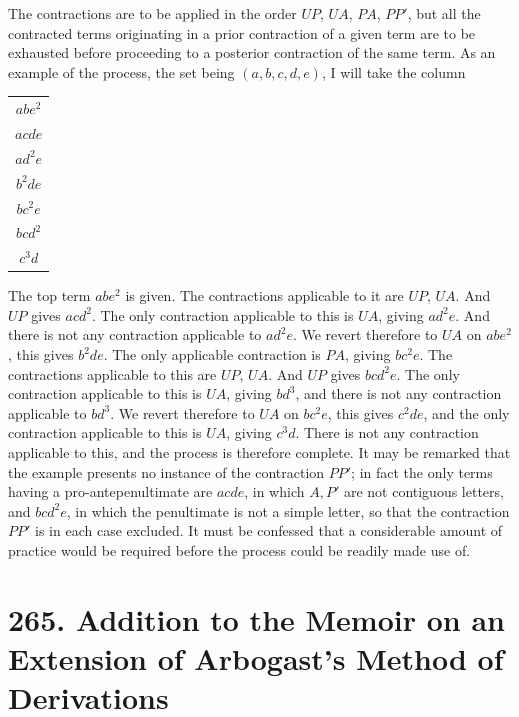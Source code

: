\documentclass[11pt,a4paper]{book}
\begin{document}
The contractions are to be applied in the order $UP$, $UA$, $PA$, $PP'$, but all the contracted terms originating in a prior contraction of a given term are to be exhausted before proceeding to a posterior contraction of the same term. As an example of the process, the set being $(a,b,c,d,e)$, I will take the column
\begin{center}
\begin{tabular}{c}
$abe^2$ \\
$acde$ \\
$ad^2e$ \\
$b^2de$ \\
$bc^2e$ \\
$bcd^2$ \\
$c^3d$ \\
\end{tabular}
\end{center}

The top term $abe^2$ is given. The contractions applicable to it are $UP$, $UA$. And $UP$ gives $acd^2$. The only contraction applicable to this is $UA$, giving $ad^2e$. And there is not any contraction applicable to $ad^2e$. We revert therefore to $UA$ on $abe^2$, this gives $b^2de$. The only applicable contraction is $PA$, giving $bc^2e$. The contractions applicable to this are $UP$, $UA$. And $UP$ gives $bcd^2e$. The only contraction applicable to this is $UA$, giving $bd^3$, and there is not any contraction applicable to $bd^3$. We revert therefore to $UA$ on $bc^2e$, this gives $c^2de$, and the only contraction applicable to this is $UA$, giving $c^3d$. There is not any contraction applicable to this, and the process is therefore complete. It may be remarked that the example presents no instance of the contraction $PP'$; in fact the only terms having a pro-antepenultimate are $acde$, in which $A,P'$ are not contiguous letters, and $bcd^2e$, in which the penultimate is not a simple letter, so that the contraction $PP'$ is in each case excluded. It must be confessed that a considerable amount of practice would be required before the process could be readily made use of.

\newpage
\section[265. Addition to the Memoir on Arbogast's Method]{265. Addition to the Memoir on an Extension of Arbogast's Method of Derivations}
\end{document}

